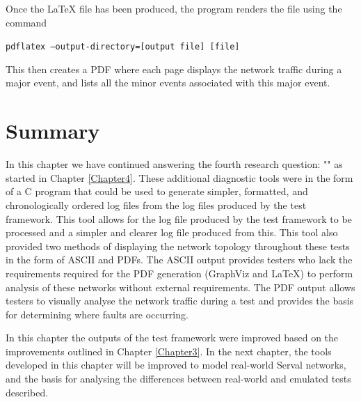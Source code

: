 Once the LaTeX file has been produced, the program renders the file using the command

\texttt{pdflatex --output-directory=[output file] [file]}

This then creates a PDF where each page displays the network traffic during a major event, and lists all the minor events associated with this major event.

\pagebreak
\section{Summary}
In this chapter we have continued answering the fourth research question: "\fourthRQ" as started in Chapter \ref{Chapter4}.
These additional diagnostic tools were in the form of a C program that could be used to generate simpler, formatted, and chronologically ordered log files from the log files produced by the test framework.
This tool allows for the log file produced by the test framework to be processed and a simpler and clearer log file produced from this.
This tool also provided two methods of displaying the network topology throughout these tests in the form of ASCII and PDFs.
The ASCII output provides testers who lack the requirements required for the PDF generation (GraphViz and LaTeX) to perform analysis of these networks without external requirements.
The PDF output allows testers to visually analyse the network traffic during a test and provides the basis for determining where faults are occurring.

In this chapter the outputs of the test framework were improved based on the improvements outlined in Chapter \ref{Chapter3}.
In the next chapter, the tools developed in this chapter will be improved to model real-world Serval networks, and the basis for analysing the differences between real-world and emulated tests described.
